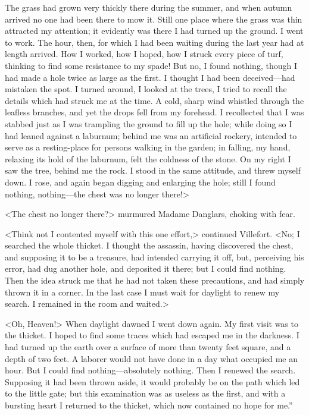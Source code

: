 The grass had grown very thickly there during the summer, and when autumn arrived no one had been there to mow it. Still one place where the grass was thin attracted my attention; it evidently was there I had turned up the ground. I went to work. The hour, then, for which I had been waiting during the last year had at length arrived. How I worked, how I hoped, how I struck every piece of turf, thinking to find some resistance to my spade! But no, I found nothing, though I had made a hole twice as large as the first. I thought I had been deceived—had mistaken the spot. I turned around, I looked at the trees, I tried to recall the details which had struck me at the time. A cold, sharp wind whistled through the leafless branches, and yet the drops fell from my forehead. I recollected that I was stabbed just as I was trampling the ground to fill up the hole; while doing so I had leaned against a laburnum; behind me was an artificial rockery, intended to serve as a resting-place for persons walking in the garden; in falling, my hand, relaxing its hold of the laburnum, felt the coldness of the stone. On my right I saw the tree, behind me the rock. I stood in the same attitude, and threw myself down. I rose, and again began digging and enlarging the hole; still I found nothing, nothing—the chest was no longer there!>  

<The chest no longer there?> murmured Madame Danglars, choking with fear. 

 <Think not I contented myself with this one effort,> continued Villefort. <No; I searched the whole thicket. I thought the assassin, having discovered the chest, and supposing it to be a treasure, had intended carrying it off, but, perceiving his error, had dug another hole, and deposited it there; but I could find nothing. Then the idea struck me that he had not taken these precautions, and had simply thrown it in a corner. In the last case I must wait for daylight to renew my search. I remained in the room and waited.> 

 <Oh, Heaven!>  When daylight dawned I went down again. My first visit was to the thicket. I hoped to find some traces which had escaped me in the darkness. I had turned up the earth over a surface of more than twenty feet square, and a depth of two feet. A laborer would not have done in a day what occupied me an hour. But I could find nothing—absolutely nothing. Then I renewed the search. Supposing it had been thrown aside, it would probably be on the path which led to the little gate; but this examination was as useless as the first, and with a bursting heart I returned to the thicket, which now contained no hope for me.” 

